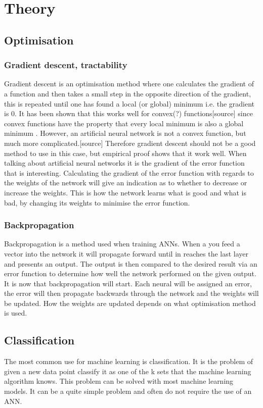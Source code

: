 \chapter{Theory}
\section{Optimisation}
\subsection{Gradient descent, tractability}%
Gradient descent is an optimisation method where one calculates the gradient of a function and then takes a small step in the opposite direction of the gradient, this is repeated until one has found a local (or global) minimum i.e. the gradient is 0. It has been shown that this works well for convex(?) functions[source] since convex functions have the property that every local minimum is also a global minimum . However, an artificial neural network is not a convex function, but much more complicated.[source] Therefore gradient descent should not be a good method to use in this case, but empirical proof shows that it work well. %
When talking about artificial neural networks it is the gradient of the error function that is interesting. Calculating the gradient of the error function with regards to the weights of the network will give an indication as to whether to decrease or increase the weights. This is how the network learns what is good and what is bad, by changing its weights to minimise the error function.
\subsection{Backpropagation}
Backpropagation is a method used when training ANNs. When a you feed a vector into the network it will propagate forward until in reaches the last layer and presents an output. The output is then compared to the desired result via an error function to determine how well the network performed on the given output. It is now that backpropagation will start. Each neural will be assigned an error, the error will then propagate backwards through the network and the weights will be updated. How the weights are updated depends on what optimisation method is used.
\section{Classification}
The most common use for machine learning is classification. It is the problem of given a new data point classify it as one of the k sets that the machine learning algorithm knows. This problem can be solved with most machine learning models. It can be a quite simple problem and often do not require the use of an ANN. %
